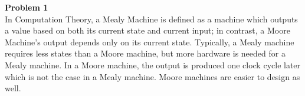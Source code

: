 \documentclass{article}
\newenvironment{problem}[2][Problem]
    { \begin{mdframed}[backgroundcolor=gray!20] \textbf{#1 #2} \\}
    {  \end{mdframed}}
\begin{document}
    \begin{problem}{1}
    	In Computation Theory, a Mealy Machine is defined as a machine which outputs a value based on 
    	both its current state and current input; in contrast, a Moore Machine's output depends only on
    	its current state.
    	Typically, a Mealy machine requires less states than a Moore machine, but more hardware is 
    	needed for a Mealy machine. In a Moore machine, the output is produced one clock cycle later
    	which is not the case in a Mealy machine. Moore machines are easier to design as well.
    \end{problem}
\end{document}
